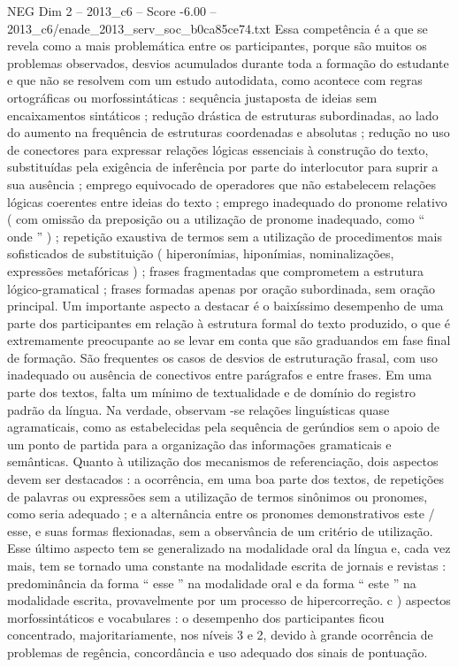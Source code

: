 \begin{textsample}{NEG Dim 2 – 2013\_c6 – Score -6.00 – 2013\_c6/enade\_2013\_serv\_soc\_b0ca85ce74.txt}
Essa competência é a que se revela como a mais problemática entre os participantes, porque são muitos os problemas observados, desvios acumulados durante toda a formação do estudante e que não se resolvem com um estudo autodidata, como acontece com regras ortográficas ou morfossintáticas : sequência justaposta de ideias sem encaixamentos sintáticos ; redução drástica de estruturas subordinadas, ao lado do aumento na frequência de estruturas coordenadas e absolutas ; redução no uso de conectores para expressar relações lógicas essenciais à construção do texto, substituídas pela exigência de inferência por parte do interlocutor para suprir a sua ausência ; emprego equivocado de operadores que não estabelecem relações lógicas coerentes entre ideias do texto ; emprego inadequado do pronome relativo ( com omissão da preposição ou a utilização de pronome inadequado, como “ onde ” ) ; repetição exaustiva de termos sem a utilização de procedimentos mais sofisticados de substituição ( hiperonímias, hiponímias, nominalizações, expressões metafóricas ) ; frases fragmentadas que comprometem a estrutura lógico-gramatical ; frases formadas apenas por oração subordinada, sem oração principal.
Um importante aspecto a destacar é o baixíssimo desempenho de uma parte dos participantes em relação à estrutura formal do texto produzido, o que é extremamente preocupante ao se levar em conta que são graduandos em fase final de formação.
São frequentes os casos de desvios de estruturação frasal, com uso inadequado ou ausência de conectivos entre parágrafos e entre frases.
Em uma parte dos textos, falta um mínimo de textualidade e de domínio do registro padrão da língua.
Na verdade, observam -se relações linguísticas quase agramaticais, como as estabelecidas pela sequência de gerúndios sem o apoio de um ponto de partida para a organização das informações gramaticais e semânticas.
Quanto à utilização dos mecanismos de referenciação, dois aspectos devem ser destacados : a ocorrência, em uma boa parte dos textos, de repetições de palavras ou expressões sem a utilização de termos sinônimos ou pronomes, como seria adequado ; e a alternância entre os pronomes demonstrativos este / esse, e suas formas flexionadas, sem a observância de um critério de utilização.
Esse último aspecto tem se generalizado na modalidade oral da língua e, cada vez mais, tem se tornado uma constante na modalidade escrita de jornais e revistas : predominância da forma “ esse ” na modalidade oral e da forma “ este ” na modalidade escrita, provavelmente por um processo de hipercorreção. c ) aspectos morfossintáticos e vocabulares : o desempenho dos participantes ficou concentrado, majoritariamente, nos níveis 3 e 2, devido à grande ocorrência de problemas de regência, concordância e uso adequado dos sinais de pontuação.

\end{textsample}

